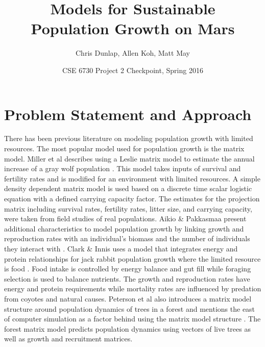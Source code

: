 \documentclass[12pt]{article}
\title{Models for Sustainable \\Population Growth on Mars}
\author{Chris Dunlap, Allen Koh, Matt May}
\date{CSE 6730 Project 2 Checkpoint, Spring 2016}
\begin{document}
\begin{titlepage}
  \maketitle
  \thispagestyle{empty}
\end{titlepage}

\newpage
  \tableofcontents
  \thispagestyle{empty}
\newpage

\section{Problem Statement and Approach}

There has been previous literature on modeling population growth with limited resources.  The most popular model used for population growth is the matrix model.  Miller et al describes using a Leslie matrix model to estimate the annual increase of a gray wolf population \cite{miller2002density}.  This model takes inputs of survival and fertility rates and is modified for an environment with limited resources.  A simple density dependent matrix model is used based on a discrete time scalar logistic equation with a defined carrying capacity factor.  The estimates for the projection matrix including survival rates, fertility rates, litter size, and carrying capacity, were taken from field studies of real populations.  Aikio \& Pakkasmaa present additional characteristics to model population growth by linking growth and reproduction rates with an individual's biomass and the number of individuals they interact with \cite{aikio2003relatedness}.  Clark \& Innis uses a model that integrates energy and protein relationships for jack rabbit population growth where the limited resource is food \cite{clark1982forage}.  Food intake is controlled by energy balance and gut fill while foraging selection is used to balance nutrients.  The growth and reproduction rates have energy and protein requirements while mortality rates are influenced by predation from coyotes and natural causes.  Peterson et al also introduces a matrix model structure around population dynamics of trees in a forest and mentions the east of computer simulation as a factor behind using the matrix model structure \cite{peterson2014modeling}.  The forest matrix model predicts population dynamics using vectors of live trees as well as growth and recruitment matrices.

\clearpage
{}

\end{document}
